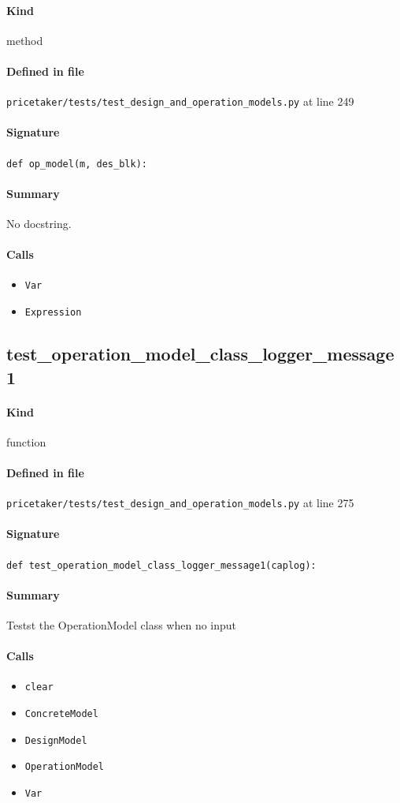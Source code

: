 \documentclass[11pt]{report}
\begin{document}
\paragraph{Kind} method
\paragraph{Defined in file} \texttt{pricetaker/tests/test\_design\_and\_operation\_models.py} at line 249
\paragraph{Signature} \texttt{def op\_model(m, des\_blk):}
\paragraph{Summary} No docstring.
\paragraph{Calls}
\begin{itemize}[leftmargin=*]
  \item \texttt{Var}
  \item \texttt{Expression}
\end{itemize}
\subsection{test\_operation\_model\_class\_logger\_message1}
\label{def:pricetaker-tests-test_design_and_operation_models.py:test_operation_model_class_logger_message1:L275}
\paragraph{Kind} function
\paragraph{Defined in file} \texttt{pricetaker/tests/test\_design\_and\_operation\_models.py} at line 275
\paragraph{Signature} \texttt{def test\_operation\_model\_class\_logger\_message1(caplog):}
\paragraph{Summary} Testst the OperationModel class when no input
\paragraph{Calls}
\begin{itemize}[leftmargin=*]
  \item \texttt{clear}
  \item \texttt{ConcreteModel}
  \item \texttt{DesignModel}
  \item \texttt{OperationModel}
  \item \texttt{Var}
\end{itemize}
\end{document}

